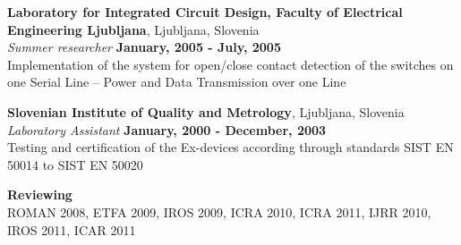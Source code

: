 \documentclass[margin,line]{res}
\begin{document}
\begin{resume}
{\bf Laboratory for Integrated Circuit Design, Faculty of Electrical Engineering Ljubljana}, 
Ljubljana, Slovenia \\
{\em Summer researcher} \hfill {\bf January, 2005 - July, 2005}\\
Implementation of the system for open/close contact detection of the switches 
on one Serial Line -- Power and Data Transmission over one Line 

{\bf Slovenian Institute of Quality and Metrology}, Ljubljana, Slovenia \\
{\em Laboratory Assistant} \hfill {\bf January, 2000 - December, 2003}\\
Testing and certification of the Ex-devices according through standards SIST EN 50014 
to SIST EN 50020

{\bf Reviewing}\\
ROMAN 2008, ETFA 2009, IROS 2009, ICRA 2010, ICRA 2011, IJRR 2010, IROS 2011, ICAR 2011


\end{resume}
\end{document}
